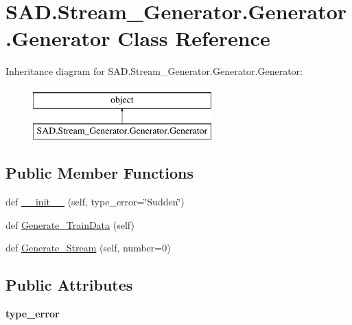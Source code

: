 \hypertarget{classSAD_1_1Stream__Generator_1_1Generator_1_1Generator}{}\section{S\+A\+D.\+Stream\+\_\+\+Generator.\+Generator.\+Generator Class Reference}
\label{classSAD_1_1Stream__Generator_1_1Generator_1_1Generator}
Inheritance diagram for S\+A\+D.\+Stream\+\_\+\+Generator.\+Generator.\+Generator\+:\begin{figure}[H]
\begin{center}
\leavevmode
\includegraphics[height=2.000000cm]{classSAD_1_1Stream__Generator_1_1Generator_1_1Generator}
\end{center}
\end{figure}
\subsection*{Public Member Functions}
\begin{DoxyCompactItemize}
\item 
def \hyperlink{classSAD_1_1Stream__Generator_1_1Generator_1_1Generator_a5377eee3255f592c8784613ec36d9b7b}{\+\_\+\+\_\+init\+\_\+\+\_\+} (self, type\+\_\+error=\char`\"{}Sudden\char`\"{})
\item 
def \hyperlink{classSAD_1_1Stream__Generator_1_1Generator_1_1Generator_a7f0553ca2a50b0f9e840b0348a3b47ee}{Generate\+\_\+\+Train\+Data} (self)
\item 
def \hyperlink{classSAD_1_1Stream__Generator_1_1Generator_1_1Generator_a81b0a47b6438dcf13608f794d82a08d9}{Generate\+\_\+\+Stream} (self, number=0)
\end{DoxyCompactItemize}
\subsection*{Public Attributes}
\begin{DoxyCompactItemize}
\item 
{\bfseries type\+\_\+error}\hypertarget{classSAD_1_1Stream__Generator_1_1Generator_1_1Generator_a9750f7a437158be00b9421d92103b4c9}{}\label{classSAD_1_1Stream__Generator_1_1Generator_1_1Generator_a9750f7a437158be00b9421d92103b4c9}

\end{DoxyCompactItemize}


